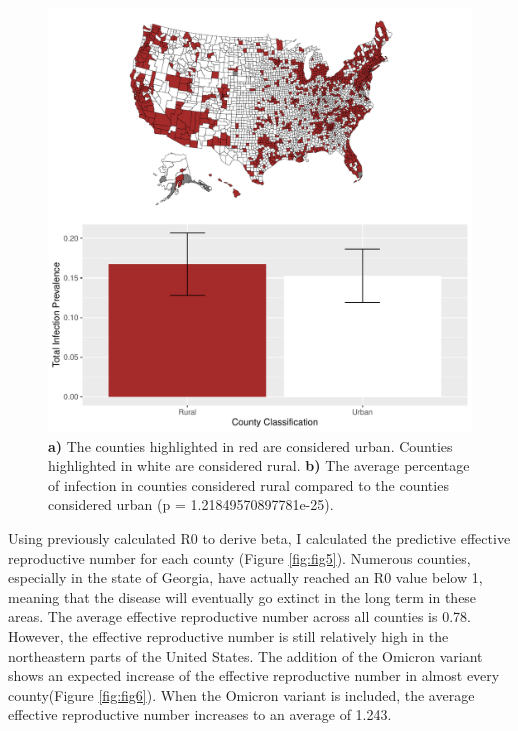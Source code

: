 \documentclass[
  12pt,
]{article}
\begin{document}
\begin{figure}[H]

{\centering \includegraphics{Final-Manuscript_files/figure-latex/fig4-1} 

}

\caption{\textbf{a)} The counties highlighted in red are considered urban. Counties highlighted in white are considered rural. \textbf{b)} The average percentage of infection in counties considered rural compared to the counties considered urban (p = 1.21849570897781e-25).}\label{fig:fig4}
\end{figure}

Using previously calculated R0 to derive beta, I calculated the predictive effective reproductive number for each county (Figure \ref{fig:fig5}). Numerous counties, especially in the state of Georgia, have actually reached an R0 value below 1, meaning that the disease will eventually go extinct in the long term in these areas. The average effective reproductive number across all counties is 0.78. However, the effective reproductive number is still relatively high in the northeastern parts of the United States. The addition of the Omicron variant shows an expected increase of the effective reproductive number in almost every county(Figure \ref{fig:fig6}). When the Omicron variant is included, the average effective reproductive number increases to an average of 1.243.
\end{document}

